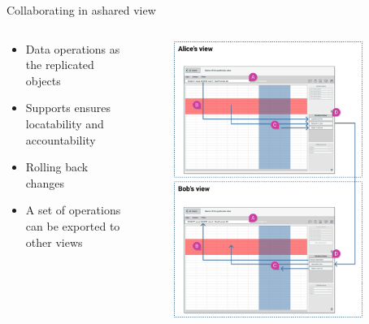 \documentclass[aspectratio=169]{beamer}
\begin{document}

\begin{frame}{Collaborating in a\newline shared view}
    \begin{columns}
        \begin{column}{0.5\textwidth}
            \begin{itemize}
                \small
                \item Data operations as the replicated objects
                \item Supports ensures locatability and accountability 
                \item Rolling back changes
                \item A set of operations can be exported to other views
            \end{itemize}
        \end{column}
        \begin{column}{0.5\textwidth}
            \begin{figure}[h]
                \vspace{-4em}
                \centering
                \includegraphics[width=0.9\textwidth]{images/shared-history.png}
            \end{figure}
        \end{column}
    \end{columns}
\end{frame}
\end{document}
